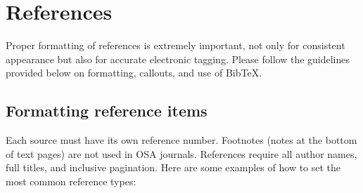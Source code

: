 \documentclass[10pt,letterpaper]{article}
\begin{document}
\section{References}
\label{sec:refs}
Proper formatting of references is extremely important, not only for consistent appearance but also for accurate electronic tagging. Please follow the guidelines provided below on formatting, callouts, and use of Bib\TeX.

\subsection{Formatting reference items}
Each source must have its own reference number. Footnotes (notes at the bottom of text pages) are not used in OSA journals. References require all author names, full titles, and inclusive pagination. Here are some examples of how to set the most common reference types:
\end{document}
